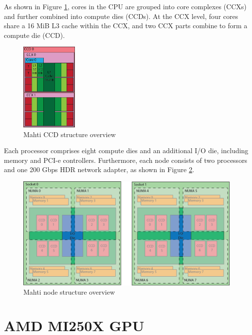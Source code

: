 As shown in Figure \ref{fig_mahti_ccd}, cores in the CPU are grouped into core complexes (CCXs) and further combined into compute dies (CCDs). At the CCX level, four cores share a 16 MiB L3 cache within the CCX, and two CCX parts combine to form a compute die (CCD).

\begin{figure}[H]
    \centering
    \includegraphics[width=0.25\textwidth]{figures/mahti_ccd.png}
    \caption{Mahti CCD structure overview \cite{mahti}}
    \label{fig_mahti_ccd}
\end{figure}

Each processor comprises eight compute dies and an additional I/O die, including memory and PCI-e controllers. Furthermore, each node consists of two processors and one 200 Gbps HDR network adapter, as shown in Figure \ref{fig_mahti_node}.

\begin{figure}[H]
    \centering
    \includegraphics[width=1\textwidth]{figures/mahti_node.png}
    \caption{Mahti node structure overview \cite{mahti}}
    \label{fig_mahti_node}
\end{figure}

\section{AMD MI250X GPU}

